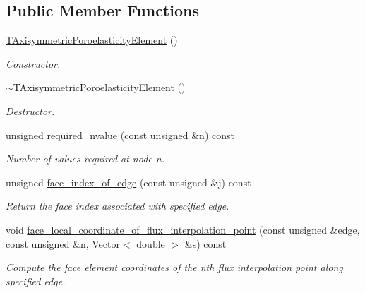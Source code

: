 \subsection*{Public Member Functions}
\begin{DoxyCompactItemize}
\item 
\hyperlink{classoomph_1_1TAxisymmetricPoroelasticityElement_aa05de51d7ccb8f104cb1015936e52754}{T\+Axisymmetric\+Poroelasticity\+Element} ()
\begin{DoxyCompactList}\small\item\em Constructor. \end{DoxyCompactList}\item 
\hyperlink{classoomph_1_1TAxisymmetricPoroelasticityElement_a7aa7d550317b1d4ed1d9c1122ea9ea8c}{$\sim$\+T\+Axisymmetric\+Poroelasticity\+Element} ()
\begin{DoxyCompactList}\small\item\em Destructor. \end{DoxyCompactList}\item 
unsigned \hyperlink{classoomph_1_1TAxisymmetricPoroelasticityElement_a4e741ac6c7cacf006e930b0793d6797f}{required\+\_\+nvalue} (const unsigned \&n) const
\begin{DoxyCompactList}\small\item\em Number of values required at node n. \end{DoxyCompactList}\item 
unsigned \hyperlink{classoomph_1_1TAxisymmetricPoroelasticityElement_a5c977c1abd1bf1a479a15491b0dbb0c2}{face\+\_\+index\+\_\+of\+\_\+edge} (const unsigned \&j) const
\begin{DoxyCompactList}\small\item\em Return the face index associated with specified edge. \end{DoxyCompactList}\item 
void \hyperlink{classoomph_1_1TAxisymmetricPoroelasticityElement_affd83cf08ab80d7888634ff2c1f58c76}{face\+\_\+local\+\_\+coordinate\+\_\+of\+\_\+flux\+\_\+interpolation\+\_\+point} (const unsigned \&edge, const unsigned \&n, \hyperlink{classoomph_1_1Vector}{Vector}$<$ double $>$ \&\hyperlink{cfortran_8h_ab7123126e4885ef647dd9c6e3807a21c}{s}) const
\begin{DoxyCompactList}\small\item\em Compute the face element coordinates of the nth flux interpolation point along specified edge. \end{DoxyCompactList}\item 

\end{DoxyCompactItemize}
